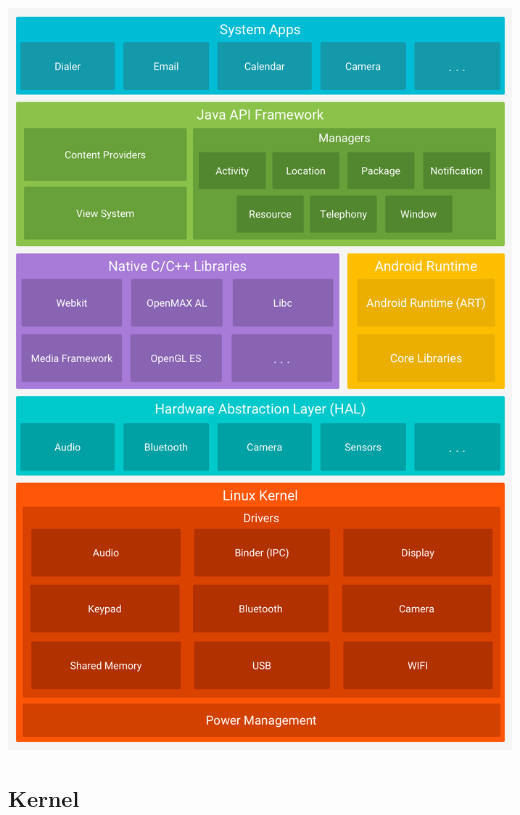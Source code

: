 \documentclass{article}
\begin{document}
\begin{multicols}{2}
\includegraphics[scale=0.1]{android-stack_2x.png}

\end{multicols}

\subsection{Kernel}
\end{document}
